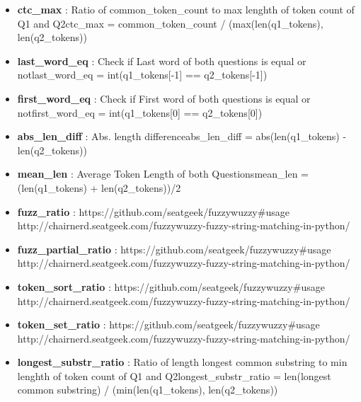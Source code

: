\documentclass[11pt]{article}
\begin{document}
\begin{itemize}
\item
  \textbf{ctc\_max} : Ratio of common\_token\_count to max lenghth of
  token count of Q1 and Q2ctc\_max = common\_token\_count /
  (max(len(q1\_tokens), len(q2\_tokens)) 
\item
  \textbf{last\_word\_eq} : Check if Last word of both questions is
  equal or notlast\_word\_eq = int(q1\_tokens{[}-1{]} ==
  q2\_tokens{[}-1{]}) 
\item
  \textbf{first\_word\_eq} : Check if First word of both questions is
  equal or notfirst\_word\_eq = int(q1\_tokens{[}0{]} ==
  q2\_tokens{[}0{]}) 
\item
  \textbf{abs\_len\_diff} : Abs. length differenceabs\_len\_diff =
  abs(len(q1\_tokens) - len(q2\_tokens)) 
\item
  \textbf{mean\_len} : Average Token Length of both Questionsmean\_len =
  (len(q1\_tokens) + len(q2\_tokens))/2 
\item
  \textbf{fuzz\_ratio} : https://github.com/seatgeek/fuzzywuzzy\#usage
  http://chairnerd.seatgeek.com/fuzzywuzzy-fuzzy-string-matching-in-python/
\item
  \textbf{fuzz\_partial\_ratio} :
  https://github.com/seatgeek/fuzzywuzzy\#usage
  http://chairnerd.seatgeek.com/fuzzywuzzy-fuzzy-string-matching-in-python/
\item
  \textbf{token\_sort\_ratio} :
  https://github.com/seatgeek/fuzzywuzzy\#usage
  http://chairnerd.seatgeek.com/fuzzywuzzy-fuzzy-string-matching-in-python/
\item
  \textbf{token\_set\_ratio} :
  https://github.com/seatgeek/fuzzywuzzy\#usage
  http://chairnerd.seatgeek.com/fuzzywuzzy-fuzzy-string-matching-in-python/
\item
  \textbf{longest\_substr\_ratio} : Ratio of length longest common
  substring to min lenghth of token count of Q1 and
  Q2longest\_substr\_ratio = len(longest common substring) /
  (min(len(q1\_tokens), len(q2\_tokens))
\end{itemize}
\end{document}
